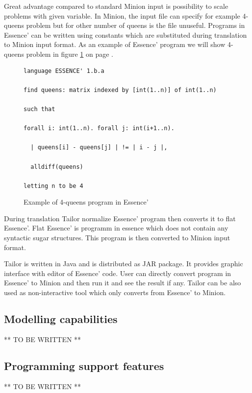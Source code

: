 Great advantage compared to standard Minion input is possibility to scale problems
with given variable. In Minion, the input file can specify for example 4-queens problem 
but for other number of queens is the file unuseful. Programs in Essence' can be written
using constants which are substituted during translation to Minion input format.
As an example of Essence' program we will show 4-queens problem in figure \ref{essence-source-4queens} 
on page \pageref{essence-source-4queens}.  

\begin{figure}
\caption{\label{essence-source-4queens}Example of 4-queens program in Essence'}
\begin{verbatim}
language ESSENCE' 1.b.a

find queens: matrix indexed by [int(1..n)] of int(1..n)

such that

forall i: int(1..n). forall j: int(i+1..n).

  | queens[i] - queens[j] | != | i - j |,

  alldiff(queens)
  
letting n to be 4
\end{verbatim}
\end{figure}

During translation Tailor normalize Essence' program then converts it to flat Essence'.
Flat Essence' is programm in essence which does not contain any syntactic sugar structures.
This program is then converted to Minion input format.

Tailor is written in Java and is distributed as JAR package. It provides graphic interface
with editor of Essence' code. User can directly convert program in Essence' to Minion
and then run it and see the result if any. Tailor can be also used as non-interactive 
tool which only converts from Essence' to Minion.

\subsection{Modelling capabilities}

** TO BE WRITTEN **

\subsection{Programming support features}

** TO BE WRITTEN **
